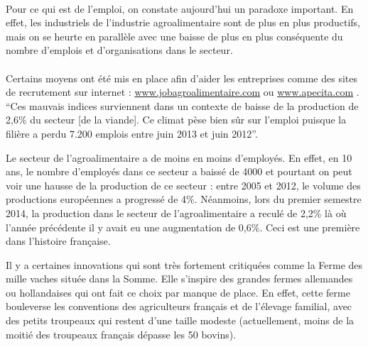 \documentclass[a4paper,12pt]{report}
\begin{document}
			\paragraph{}Pour ce qui est de l’emploi, on constate aujourd'hui un paradoxe important. En effet, les industriels de l’industrie agroalimentaire sont de plus en plus productifs, mais on se heurte en parallèle avec une baisse de plus en plus conséquente du nombre d’emplois et d’organisations dans le secteur.
			
			\paragraph{}Certains moyens ont été mis en place afin d’aider les entreprises comme des sites de recrutement sur internet : \url{www.jobagroalimentaire.com} ou \url{www.apecita.com} .  “Ces mauvais indices surviennent dans un contexte de baisse de la production de 2,6\% du secteur [de la viande]. Ce climat pèse bien sûr sur l'emploi puisque la filière a perdu 7.200 emplois entre juin 2013 et juin 2012”\cite{DeficitCommercialViandeAggrave}.
			
			Le secteur de l’agroalimentaire a de moins en moins d’employés. En effet, en 10 ans, le nombre d’employés dans ce secteur a baissé de 4000\cite{IAAHeritageAgricoleBretagne} et pourtant on peut voir une hausse de la production de ce secteur : entre 2005 et 2012, le volume des productions européennes a progressé de 4\%\cite{HausseModereeVenteProduitsAA2012}. Néanmoins, lors du premier semestre 2014, la production dans le secteur de l’agroalimentaire a reculé de 2,2\% là où l’année précédente il y avait eu une augmentation de 0,6\%\cite{ReculHistoriqueProductionAAFrance}. Ceci est une première dans l’histoire française.
			
			Il y a certaines innovations qui sont très fortement critiquées comme la Ferme des mille vaches située dans la Somme\cite{Ferme1000Vaches}. Elle s'inspire des grandes fermes allemandes ou hollandaises qui ont fait ce choix par manque de place. En effet, cette ferme bouleverse les conventions des agriculteurs français et de l'élevage familial, avec des petits troupeaux qui restent d’une taille modeste (actuellement, moins de la moitié des troupeaux français dépasse les 50 bovins).
			
\end{document}
